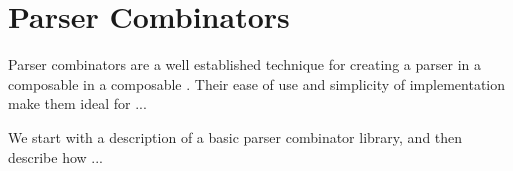 \section{Parser Combinators}

Parser combinators are a well established technique for creating a parser in a composable in a composable . Their ease of use and simplicity of implementation make them ideal for ...

We start with a description of a basic parser combinator library, and then describe how ...
